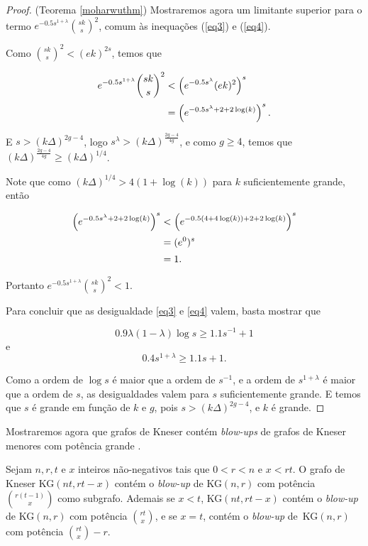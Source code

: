 \begin{proof}{(Teorema \ref{moharwuthm})}
Mostraremos agora um limitante superior para o termo $e^{-0.5s^{1+\lambda}}\binom{sk}{s}^2$, comum às inequações (\ref{eq3}) e (\ref{eq4}).

Como $\binom{sk}{s}^2 < (ek)^{2s}$, temos que

\begin{equation*}
\setlength{\jot}{5pt}
\begin{aligned}
e^{-0.5s^{1+\lambda}}\binom{sk}{s}^2 &< \left(e^{-0.5s^{\lambda}}(ek)^2\right)^s\\
&= \left(e^{-0.5s^\lambda + 2 + 2\log(k)}\right)^s.
\end{aligned}
\end{equation*}

E $s > (k\Delta)^{2g-4}$, logo $s^\lambda > (k\Delta)^{\frac{2g-4}{4g}}$, e como $g \geq 4$, temos que $(k\Delta)^{\frac{2g-4}{4g}} \geq (k\Delta)^{1/4}$. 

Note que como $(k\Delta)^{1/4} > 4(1+\log(k))$ para $k$ suficientemente grande, então

\begin{equation*}
\setlength{\jot}{5pt}
\begin{aligned}
\left(e^{-0.5s^\lambda + 2 + 2\log(k)}\right)^s &< \left(e^{-0.5(4+4\log(k)) + 2 + 2\log(k)}\right)^s\\ 
&= (e^0)^s \\
&= 1.
\end{aligned}
\end{equation*}

Portanto $e^{-0.5s^{1+\lambda}}\binom{sk}{s}^2 < 1$.

Para concluir que as desigualdade \ref{eq3} e \ref{eq4} valem, basta mostrar que

\[0.9\lambda(1-\lambda)\log s \geq 1.1s^{-1} + 1\]
e
\[0.4s^{1+\lambda}\geq 1.1s + 1.\]

Como a ordem de $\log s$ é maior que a ordem de $s^{-1}$, e a ordem de $s^{1+\lambda}$ é maior que a ordem de $s$, as desigualdades valem para $s$ suficientemente grande. E temos que $s$ é grande em função de $k$ e $g$, pois $s > (k\Delta)^{2g-4}$, e $k$ é grande.
\end{proof}

Mostraremos agora que grafos de Kneser contém \textit{blow-ups} de grafos de Kneser menores com potência grande \cite{mohar2016dichromatic}.

\begin{teorema}\label{moharwukn}
Sejam $n,r,t$ e $x$ inteiros não-negativos tais que $0 < r < n$ e $x < rt$. O grafo de Kneser KG$(nt, rt-x)$ contém o \textit{blow-up} de KG$(n,r)$ com potência $\binom{r(t-1)}{x}$ como subgrafo. Ademais se $x < t$, KG$(nt, rt-x)$ contém o \textit{blow-up} de KG$(n,r)$ com potência $\binom{rt}{x}$, e se $x = t$, contém o \textit{blow-up} de~KG$(n,r)$ com potência $\binom{rt}{x}-r$.
\end{teorema}

